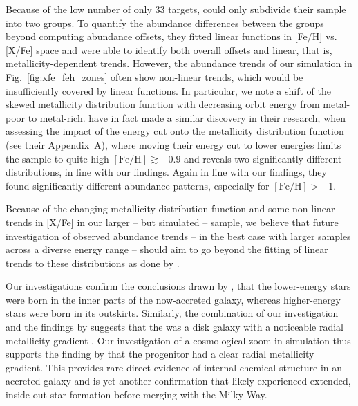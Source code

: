 \documentclass[fleqn,usenatbib]{mnras}
\begin{document}
Because of the low number of only 33 targets, \citet{Skuladottir2025} could only subdivide their sample into two groups. To quantify the abundance differences between the groups beyond computing abundance offsets, they fitted linear functions in [Fe/H] vs. [X/Fe] space and were able to identify both overall offsets and linear, that is, metallicity-dependent trends. However, the abundance trends of our simulation in Fig.~\ref{fig:xfe_feh_zones} often show non-linear trends, which would be insufficiently covered by linear functions. In particular, we note a shift of the skewed metallicity distribution function with decreasing orbit energy from metal-poor to metal-rich. \citet{Skuladottir2025} have in fact made a similar discovery in their research, when assessing the impact of the energy cut onto the metallicity distribution function (see their Appendix~A), where moving their energy cut to lower energies limits the sample to quite high $\mathrm{[Fe/H]} \gtrsim -0.9$ and reveals two significantly different distributions, in line with our findings. Again in line with our findings, they found significantly different abundance patterns, especially for $\mathrm{[Fe/H]} > -1$.

Because of the changing metallicity distribution function and some non-linear trends in [X/Fe] in our larger -- but simulated -- sample, we believe that future investigation of observed abundance trends -- in the best case with larger samples across a diverse energy range -- should aim to go beyond the fitting of linear trends to these distributions as done by \citet{Skuladottir2025}.

Our investigations confirm the conclusions drawn by \citet{Skuladottir2025}, that the lower-energy stars were born in the inner parts of the now-accreted galaxy, whereas higher-energy stars were born in its outskirts. Similarly, the combination of our investigation and the findings by \citet{Skuladottir2025} suggests that the  was a disk galaxy with a noticeable radial metallicity gradient%
. Our investigation of a cosmological zoom-in simulation thus supports the finding by \citet{Skuladottir2025} that the  progenitor had a clear radial metallicity gradient. This provides rare direct evidence of internal chemical structure in an accreted galaxy and is yet another confirmation that  likely experienced extended, inside-out star formation before merging with the Milky Way.
\end{document}
